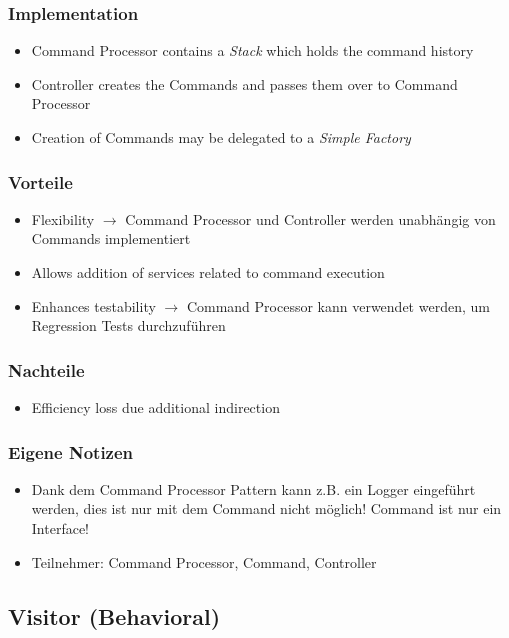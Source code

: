 \subsubsection{Implementation}
\begin{itemize}[topsep=0pt]
    \itemsep -0.4em
    \item Command Processor contains a \textit{Stack} which holds the command history
    \item Controller creates the Commands and passes them over to Command Processor
    \item Creation of Commands may be delegated to a \textit{Simple Factory}
\end{itemize}
\subsubsection{Vorteile}
\begin{itemize}[topsep=0pt]
    \itemsep -0.4em
    \item Flexibility $\rightarrow$ Command Processor und Controller werden unabhängig von Commands implementiert
    \item Allows addition of services related to command execution
    \item Enhances testability $\rightarrow$ Command Processor kann verwendet werden, um Regression Tests durchzuführen
\end{itemize}
\subsubsection{Nachteile}
\begin{itemize}[topsep=0pt]
    \itemsep -0.4em
    \item Efficiency loss due additional indirection
\end{itemize}
\subsubsection{Eigene Notizen}
\begin{itemize}
    \item Dank dem Command Processor Pattern kann z.B. ein Logger eingeführt werden, dies ist nur mit dem Command nicht möglich! Command ist nur ein Interface!
    \item Teilnehmer: Command Processor, Command, Controller
\end{itemize}

\subsection{Visitor (Behavioral)}
